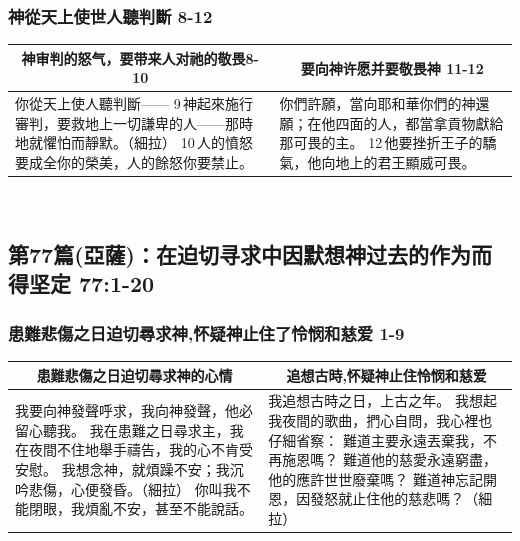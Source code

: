 \subsubsection{神從天上使世人聽判斷 8-12}
\begin{table}[H]\centering
\begin{tabular}{p{8.75cm}|p{8.7cm}}\hline\hline
\multicolumn{1}{c|}{神审判的怒气，要带来人对祂的敬畏8-10}&\multicolumn{1}{c}{要向神许愿并要敬畏神 11-12}\\\hline
你從天上使人聽判斷——
9 神起來施行審判，要救地上一切謙卑的人——那時地就懼怕而靜默。（細拉）
10 人的憤怒要成全你的榮美，人的餘怒你要禁止。
&你們許願，當向耶和華你們的神還願；在他四面的人，都當拿貢物獻給那可畏的主。
12 他要挫折王子的驕氣，他向地上的君王顯威可畏。\\\hline
\end{tabular}
\end{table} 


\subsection{第77篇(亞薩)：在迫切寻求中因默想神过去的作为而得坚定  77:1-20}
\subsubsection{患難悲傷之日迫切尋求神,怀疑神止住了怜悯和慈爱  1-9}
\begin{table}[H]\centering
\begin{tabular}{p{8.75cm}|p{8.7cm}}\hline\hline
\multicolumn{1}{c|}{患難悲傷之日迫切尋求神的心情}&\multicolumn{1}{c}{追想古時,怀疑神止住怜悯和慈爱}\\\hline
我要向神發聲呼求，我向神發聲，他必留心聽我。
我在患難之日尋求主，我在夜間不住地舉手禱告，我的心不肯受安慰。
我想念神，就煩躁不安；我沉吟悲傷，心便發昏。（細拉）
你叫我不能閉眼，我煩亂不安，甚至不能說話。
&我追想古時之日，上古之年。
我想起我夜間的歌曲，捫心自問，我心裡也仔細省察：
難道主要永遠丟棄我，不再施恩嗎？
難道他的慈愛永遠窮盡，他的應許世世廢棄嗎？
難道神忘記開恩，因發怒就止住他的慈悲嗎？（細拉）\\\hline
\end{tabular}
\end{table} 

